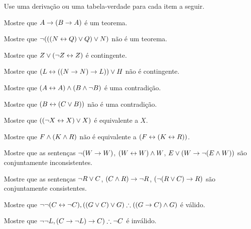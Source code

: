 \noindent\problempart Use uma derivação ou uma tabela-verdade para cada item a seguir.
\begin{compactlist}%
\item Mostre que $A \rightarrow (B \rightarrow A)$ é um teorema.
\item Mostre que $\neg (((N \leftrightarrow Q) \vee Q) \vee N)$ não é um teorema.
\item Mostre que $ Z \vee (\neg Z \leftrightarrow Z) $ é contingente.
\item Mostre que $ (L \leftrightarrow ((N \rightarrow N) \rightarrow L)) \vee H $ não é contingente.
\item Mostre que $ (A \leftrightarrow A) \wedge (B \wedge \neg B)$ é uma contradição.
\item Mostre que $ (B \leftrightarrow (C \vee B)) $ não é uma contradição.
\item Mostre que $ ((\neg X \leftrightarrow X) \vee X) $ é equivalente a $X$.
\item Mostre que $F \wedge (K \wedge R) $ não é equivalente a $ (F \leftrightarrow (K \leftrightarrow R))$.
\item Mostre que as sentenças $ \neg (W \rightarrow W)$, $(W \leftrightarrow W) \wedge W$, $E \vee (W \rightarrow \neg (E \wedge W))$ são conjuntamente inconsistentes.
\item Mostre que as sentenças $\neg R \vee C $, $(C \wedge R) \rightarrow \neg R$, $(\neg (R \vee C) \rightarrow R) $ são conjuntamente consistentes.
\item Mostre que $\enot \enot (C \eiff \enot C), ((G \eor C) \eor G) \therefore ((G \eif C) \eand G) $ é válido.
\item Mostre que $ \enot \enot L,  (C \eif \enot L) \eif C) \therefore \enot C$ é inválido.
\end{compactlist}
